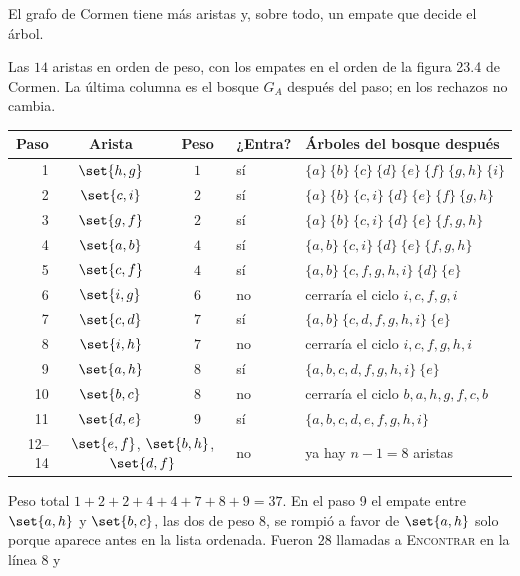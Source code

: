 \documentclass[11pt,letterpaper]{article}
\begin{document}
El grafo de Cormen tiene más aristas y, sobre todo, un empate que
decide el árbol.

\begin{ejemplo}
  \label{ej:kruskal-cormen}
  Las $14$ aristas en orden de peso, con los empates en el orden de la
  figura 23.4 de Cormen. La última columna es el bosque $G_A$ después
  del paso; en los rechazos no cambia.
  \begin{center}
  \small
  \begin{tabular}{rcclp{7.2cm}}
    \toprule
    \textbf{Paso} & \textbf{Arista} & \textbf{Peso} & \textbf{¿Entra?}
      & \textbf{Árboles del bosque después} \\
    \midrule
    1 & $\set{h,g}$ & $1$ & sí
      & $\{a\}\ \{b\}\ \{c\}\ \{d\}\ \{e\}\ \{f\}\ \{g,h\}\ \{i\}$ \\
    2 & $\set{c,i}$ & $2$ & sí
      & $\{a\}\ \{b\}\ \{c,i\}\ \{d\}\ \{e\}\ \{f\}\ \{g,h\}$ \\
    3 & $\set{g,f}$ & $2$ & sí
      & $\{a\}\ \{b\}\ \{c,i\}\ \{d\}\ \{e\}\ \{f,g,h\}$ \\
    4 & $\set{a,b}$ & $4$ & sí
      & $\{a,b\}\ \{c,i\}\ \{d\}\ \{e\}\ \{f,g,h\}$ \\
    5 & $\set{c,f}$ & $4$ & sí
      & $\{a,b\}\ \{c,f,g,h,i\}\ \{d\}\ \{e\}$ \\
    6 & $\set{i,g}$ & $6$ & no & cerraría el ciclo $i, c, f, g, i$ \\
    7 & $\set{c,d}$ & $7$ & sí & $\{a,b\}\ \{c,d,f,g,h,i\}\ \{e\}$ \\
    8 & $\set{i,h}$ & $7$ & no & cerraría el ciclo $i, c, f, g, h, i$ \\
    9 & $\set{a,h}$ & $8$ & sí & $\{a,b,c,d,f,g,h,i\}\ \{e\}$ \\
    10 & $\set{b,c}$ & $8$ & no
      & cerraría el ciclo $b, a, h, g, f, c, b$ \\
    11 & $\set{d,e}$ & $9$ & sí & $\{a,b,c,d,e,f,g,h,i\}$ \\
    12--14 & \multicolumn{2}{c}{$\set{e,f}$, $\set{b,h}$, $\set{d,f}$}
      & no & ya hay $n - 1 = 8$ aristas \\
    \bottomrule
  \end{tabular}
  \end{center}
  Peso total $1 + 2 + 2 + 4 + 4 + 7 + 8 + 9 = 37$. En el paso 9 el
  empate entre $\set{a,h}$ y $\set{b,c}$, las dos de peso $8$, se
  rompió a favor de $\set{a,h}$ solo porque aparece antes en la lista
  ordenada. Fueron $28$ llamadas a \textsc{Encontrar} en la línea 8 y

\end{ejemplo}
\end{document}
